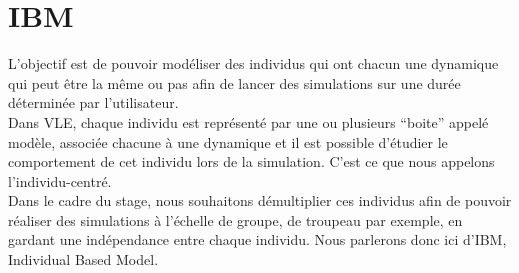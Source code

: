 \section{IBM}
L'objectif est de pouvoir modéliser des individus qui ont chacun une dynamique qui peut être la même ou pas afin de lancer des simulations sur une durée déterminée par l'utilisateur.\\
Dans VLE, chaque individu est représenté par une ou plusieurs ``boite'' appelé modèle, associée chacune à une dynamique et il est possible d'étudier le comportement de cet individu lors de la simulation. C'est ce que nous appelons l'individu-centré.\\
Dans le cadre du stage, nous souhaitons démultiplier ces individus afin de pouvoir réaliser des simulations à l'échelle de groupe, de troupeau par exemple, en gardant une indépendance entre chaque individu. Nous parlerons donc ici d'IBM, Individual Based Model.


